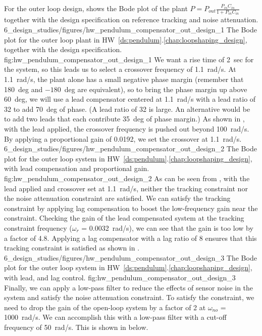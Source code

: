 For the outer loop design,  shows the Bode plot of the plant $P=P_{out}\frac{P_{in}C_{in}}{1+P_{in}C_{in}}$ together with the design specification on reference tracking and noise attenuation.  
%
	{6_design_studies/figures/hw_pendulum_compensator_out_design_1}
	{The Bode plot for the outer loop plant in HW~\ref{ds:pendulum}.\ref{chap:loopshaping_design}, together with the design specification.}
	{fig:hw_pendulum_compensator_out_design_1}
We want a rise time of 2~sec for the system, so this leads us to select a crossover frequency of 1.1~rad/s. At 1.1~rad/s, the plant alone has a small negative phase margin (remember that 180~deg and $-180$~deg are equivalent), so to bring the phase margin up above 60~deg, we will use a lead compensator centered at 1.1~rad/s with a lead ratio of 32 to add 70~deg of phase. (A lead ratio of 32 is large. An alternative would be to add two leads that each contribute 35~deg of phase margin.) As shown in , with the lead applied, the crossover frequency is pushed out beyond 100~rad/s. By applying a proportional gain of 0.0192, we set the crossover at 1.1~rad/s.
	{6_design_studies/figures/hw_pendulum_compensator_out_design_2}
	{The Bode plot for the outer loop system in HW~\ref{ds:pendulum}.\ref{chap:loopshaping_design}, with lead compensation and proportional gain.}
	{fig:hw_pendulum_compensator_out_design_2}
As can be seen from , with the lead applied and crossover set at 1.1~rad/s, neither the tracking constraint nor the noise attenuation constraint are satisfied. We can satisfy the tracking constraint by applying lag compensation to boost the low-frequency gain near the constraint. Checking the gain of the lead compensated system at the tracking constraint frequency ($\omega_r$ = 0.0032~rad/s), we can see that the gain is too low by a factor of 4.8. Applying a lag compensator with a lag ratio of 8 ensures that this tracking constraint is satisfied as shown in .
%
	{6_design_studies/figures/hw_pendulum_compensator_out_design_3}
	{The Bode plot for the outer loop system in HW~\ref{ds:pendulum}.\ref{chap:loopshaping_design}, with lead, and lag control.}
	{fig:hw_pendulum_compensator_out_design_3}
%
Finally, we can apply a low-pass filter to reduce the effects of sensor noise in the system and satisfy the noise attenuation constraint. To satisfy the constraint, we need to drop the gain of the open-loop system by a factor of 2 at $\omega_{no}$ = 1000~rad/s. We can accomplish this with a low-pass filter with a cut-off frequency of 50~rad/s. This is shown in  below.
